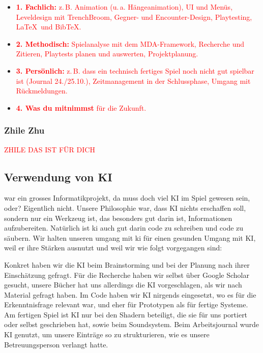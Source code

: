 \documentclass[../Main.tex]{subfiles}
\begin{document}
\begin{itemize}[leftmargin=1.5cm]
    \item \textcolor{red}{\textbf{1. Fachlich:} z.\,B. Animation (u.\,a. Hängeanimation), UI und Menüs, Leveldesign mit TrenchBroom, Gegner- und Encounter-Design, Playtesting, \LaTeX\ und BibTeX.}
    \item \textcolor{red}{\textbf{2. Methodisch:} Spielanalyse mit dem MDA-Framework, Recherche und Zitieren, Playtests planen und auswerten, Projektplanung.}
    \item \textcolor{red}{\textbf{3. Persönlich:} z.\,B. dass ein technisch fertiges Spiel noch nicht gut spielbar ist (Journal 24./25.10.), Zeitmanagement in der Schlussphase, Umgang mit Rückmeldungen.}
    \item \textcolor{red}{\textbf{4. Was du mitnimmst} für die Zukunft.}
\end{itemize}

\subsubsection{Zhile Zhu}

\textcolor{red}{ZHILE DAS IST FÜR DICH}

\subsection{Verwendung von KI} \label{sec:ReflexionKI}

 war ein grosses Informatikprojekt, da muss doch viel KI im Spiel gewesen sein, oder? Eigentlich nicht. Unsere Philosophie war, dass KI nichts erschaffen soll, sondern nur ein Werkzeug ist, das besonders gut darin ist, Informationen aufzubereiten. Natürlich ist ki auch gut darin code zu schreiben und code zu säubern. Wir halten unseren umgang mit ki für einen gesunden Umgang mit KI, weil er ihre Stärken ausnutzt und weil wir wie folgt vorgegangen sind:

Konkret haben wir die KI beim Brainstorming und bei der Planung nach ihrer Einschätzung gefragt. Für die Recherche haben wir selbst über Google Scholar gesucht, unsere Bücher hat uns allerdings die KI vorgeschlagen, als wir nach Material gefragt haben. Im Code haben wir KI nirgends eingesetzt, wo es für die Erkenntnisfrage relevant war, und eher für Prototypen als für fertige Systeme. Am fertigen Spiel ist KI nur bei den Shadern beteiligt, die sie für uns portiert oder selbst geschrieben hat, sowie beim Soundsystem. Beim Arbeitsjournal wurde KI genutzt, um unsere Einträge so zu strukturieren, wie es unsere Betreuungsperson verlangt hatte.
\end{document}
